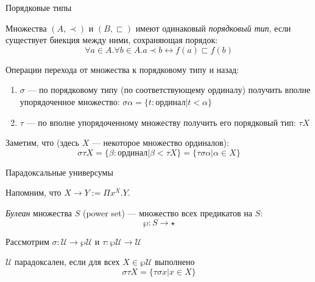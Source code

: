 \documentclass[aspectratio=169,dvipsnames,usenames]{beamer}
\begin{document}
\begin{frame}{Порядковые типы}

\begin{definition}Множества $(A,\prec)$ и $(B,\sqsubset)$ имеют одинаковый \emph{порядковый тип}, если существует биекция между ними, сохраняющая порядок:
$$\forall a\in A.\forall b \in A.a \prec b \leftrightarrow f(a) \sqsubset f(b)$$
\end{definition}

\begin{definition}Операции перехода от множества к порядковому типу и назад:
\begin{enumerate}
\item $\sigma$ --- по порядковому типу (по соответствующему ординалу) получить вполне упорядоченное множество: $\sigma\alpha = \{ t: \text{ординал} | t < \alpha \}$
\item $\tau$ --- по вполне упорядоченному множеству получить его порядковый тип: $\tau X$
\end{enumerate}

Заметим, что (здесь $X$ --- некоторое множество ординалов):
 $$\sigma\tau X = \{ \beta : \text{ординал} | \beta < \tau X\} = \{ \tau\sigma\alpha | \alpha \in X \}$$
\end{definition}

\end{frame}
\begin{frame}{Парадоксальные универсумы}

Напомним, что $X \rightarrow Y := \Pi x^X.Y$.

\begin{definition}\emph{Булеан} множества $S$ (power set) --- множество всех предикатов на $S$:
$$\wp: S \rightarrow \star$$
\end{definition}


Рассмотрим $\sigma: \mathcal{U}\rightarrow\wp\mathcal{U}$ и $\tau: \wp\mathcal{U}\rightarrow\mathcal{U}$

\begin{definition}
$\mathcal{U}$ парадоксален, если для всех $X \in \wp\mathcal{U}$ выполнено $$\sigma\tau X = \{\tau\sigma x | x \in X \}$$
\end{definition}


\end{frame}
\end{document}
